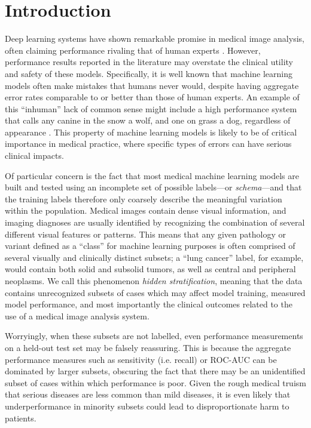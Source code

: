 \documentclass[sigconf]{acmart}
\begin{document}
\section{Introduction}
Deep learning systems have shown remarkable promise in medical image analysis, often claiming performance rivaling that of human experts \citep{esteva2019guide}. 
 However, performance results reported in the literature may overstate the clinical utility and safety of these models.  
 Specifically, it is well known that machine learning models often make mistakes that humans never would, despite having aggregate error rates comparable to or better than those of human experts. An example of this ``inhuman'' lack of common sense might include a high performance system that calls any canine in the snow a wolf, and one on grass a dog, regardless of appearance \citep{ribeiro2016should}.
This property of machine learning models is likely to be of critical importance in medical practice, where specific types of errors can have serious clinical impacts. 
 
Of particular concern is the fact that most medical machine learning models are built and tested using an incomplete set of possible labels---or \textit{schema}---and that the training labels therefore only coarsely describe the meaningful variation within the population. 
Medical images contain dense visual information, and imaging diagnoses are usually identified by recognizing the combination of several different visual features or patterns. 
This means that any given pathology or variant defined as a ``class'' for machine learning purposes is often comprised of several visually and clinically distinct subsets; a ``lung cancer'' label, for example, would contain both solid and subsolid tumors, as well as central and peripheral neoplasms. 
We call this phenomenon \textit{hidden stratification}, meaning that the data contains unrecognized subsets of cases which may affect model training, measured model performance, and most importantly the clinical outcomes related to the use of a medical image analysis system.  

Worryingly, when these subsets are not labelled, even performance measurements on a held-out test set may be falsely reassuring. 
This is because the aggregate performance measures such as sensitivity (i.e. recall) or ROC-AUC can be dominated by larger subsets, obscuring the fact that there may be an unidentified subset of cases within which performance is poor. 
Given the rough medical truism that serious diseases are less common than mild diseases, it is even likely that underperformance in minority subsets could lead to disproportionate harm to patients.
\end{document}
